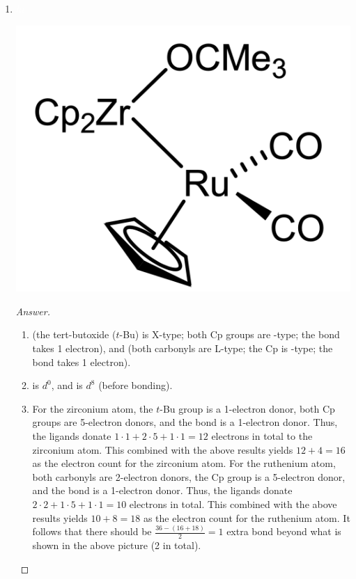 \documentclass[../psets.tex]{subfiles}
\begin{document}
\begin{enumerate}
\begin{enumerate}[label={\arabic*)}]
\begin{proof}[Answer]
            \begin{enumerate}[label={(\roman*)}]
                \item {} (the methyl is X-type; the hydride is X-type; the other ligand (PNP) is -type but carries a positive formal charge).
                \item {} is $d^8$.
                \item The methyl group is a 1-electron donor, the hydrogen is a 1-electron donor, and the PNP group is a 7-electron donor (3 dative bonds plus a single positive formal charge on the leftmost nitrogen in the above picture). Thus, the ligands donate $1\cdot 1+1\cdot 1+1\cdot 7=9$ electrons in total. This combined with the above result yields $9+9=18$ as the electron count.
            \end{enumerate}
        \end{proof}
        \item ${\color{white}hi}$
        \begin{center}
            \includegraphics[width=0.24\linewidth]{../ExtFiles/pset1-1-18.png}
        \end{center}
        \begin{proof}[Answer]\leavevmode
            \begin{enumerate}[label={(\roman*)}]
                \item {} (the tert-butoxide ($t$-Bu) is X-type; both Cp groups are -type; the  bond takes 1 electron), and  (both carbonyls are L-type; the Cp is -type; the  bond takes 1 electron).
                \item {} is $d^0$, and  is $d^8$ (before  bonding).
                \item For the zirconium atom, the $t$-Bu group is a 1-electron donor, both Cp groups are 5-electron donors, and the  bond is a 1-electron donor. Thus, the ligands donate $1\cdot 1+2\cdot 5+1\cdot 1=12$ electrons in total to the zirconium atom. This combined with the above results yields $12+4=16$ as the electron count for the zirconium atom. For the ruthenium atom, both carbonyls are 2-electron donors, the Cp group is a 5-electron donor, and the  bond is a 1-electron donor. Thus, the ligands donate $2\cdot 2+1\cdot 5+1\cdot 1=10$ electrons in total. This combined with the above results yields $10+8=18$ as the electron count for the ruthenium atom. It follows that there should be $\frac{36-(16+18)}{2}=1$ extra  bond beyond what is shown in the above picture (2 in total).

\end{enumerate}
\end{proof}
\end{enumerate}
\end{enumerate}
\end{document}
